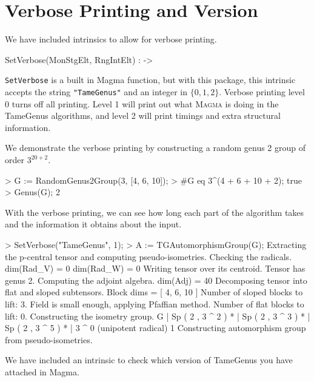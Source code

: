 \documentclass{documentation}
\begin{document}
\section{Verbose Printing and Version}

We have included intrinsics to allow for verbose printing. 

\begin{intrinsics}
SetVerbose(MonStgElt, RngIntElt) : -> 
\end{intrinsics}

\texttt{SetVerbose} is a built in Magma function, but with this package, this intrinsic accepts the string \texttt{"TameGenus"} and an integer in $\{0,1,2\}$. Verbose printing level 0 turns off all printing. 
Level 1 will print out what \textsc{Magma} is doing in the \textsf{TameGenus} algorithms, and level 2 will print timings and extra structural information.

\begin{example}[VerbosePrinting]
  We demonstrate the verbose printing by constructing a random genus 2 group of order $3^{20 + 2}$.

\begin{code}
> G := RandomGenus2Group(3, [4, 6, 10]);
> #G eq 3^(4 + 6 + 10 + 2);
true
> Genus(G);
2
\end{code}

With the verbose printing, we can see how long each part of the algorithm takes and the information it obtains about the input.
\begin{code}
> SetVerbose("TameGenus", 1);
> A := TGAutomorphismGroup(G);
Extracting the p-central tensor and computing pseudo-isometries.
Checking the radicals.
        dim(Rad_V) = 0
        dim(Rad_W) = 0
Writing tensor over its centroid.
Tensor has genus 2.
Computing the adjoint algebra.
        dim(Adj) = 40
Decomposing tensor into flat and sloped subtensors.
        Block dims = [ 4, 6, 10 ]
Number of sloped blocks to lift: 3.
Field is small enough, applying Pfaffian method.
Number of flat blocks to lift: 0.
Constructing the isometry group.
   G
   |   Sp ( 2 , 3 ^ 2 )
   *
   |   Sp ( 2 , 3 ^ 3 )
   *
   |   Sp ( 2 , 3 ^ 5 )
   *
   |   3 ^ 0    (unipotent radical)
   1
Constructing automorphism group from pseudo-isometries.
\end{code}
\end{example}

We have included an intrinsic to check which version of \textsf{TameGenus} you have attached in Magma.
\end{document}
